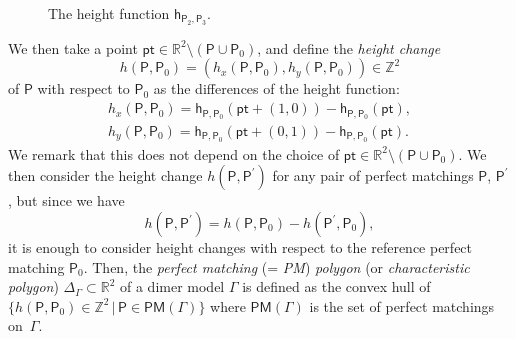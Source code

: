 \documentclass[pdftex]{sigma}%
\numberwithin{equation}{section}
\numberwithin{figure}{section}
\numberwithin{table}{section}
\newcommand{\ZZ}{\mathbb{Z}}
\newcommand{\RR}{\mathbb{R}}
\newcommand{\pt}{\mathsf{pt}}
\newcommand{\sfh}{\mathsf{h}}
\newcommand{\sfP}{\mathsf{P}}
\newcommand{\PM}{\mathsf{PM}}
\begin{document}
\begin{figure}[h!]
{
}
\caption{The height function $\sfh_{\sfP_2,\sfP_3}$.}\label{fig_heightchnge}
\end{figure}

We then take a point $\pt\in\RR^2{\setminus}(\sfP\cup\sfP_0)$, and define the \emph{height change}
\begin{displaymath}
h(\sfP,\sfP_0)=(h_x(\sfP,\sfP_0),h_y(\sfP,\sfP_0))\in\ZZ^2
\end{displaymath}
of $\sfP$ with respect to $\sfP_0$ as the differences of the height function:
\begin{gather*}
h_x(\sfP,\sfP_0)=\sfh_{\sfP,\sfP_0}(\pt+(1,0))-\sfh_{\sfP,\sfP_0}(\pt),
\\
h_y(\sfP,\sfP_0)=\sfh_{\sfP,\sfP_0}(\pt+(0,1))-\sfh_{\sfP,\sfP_0}(\pt).
\end{gather*}
We remark that this does not depend on the choice of $\pt\in\RR^2{\setminus}(\sfP\cup\sfP_0)$.
We then consider the height change $h(\sfP,\sfP^\prime)$ for any pair of perfect matchings $\sfP$, $\sfP^\prime$,
but since we have
\begin{equation*}%
h(\sfP,\sfP^\prime)=h(\sfP,\sfP_0)-h(\sfP^\prime,\sfP_0),
\end{equation*}
it is enough to consider height changes with respect to the reference perfect matching $\sfP_0$.
Then, the \emph{perfect matching} (= \emph{PM}) \emph{polygon} (or \emph{characteristic polygon}) $\Delta_\Gamma\subset\RR^2$ of a dimer model $\Gamma$ is defined
as the convex hull of $\big\{h(\sfP,\sfP_0)\in\ZZ^2\,|\, \sfP\in\PM(\Gamma)\big\}$ where $\PM(\Gamma)$ is the set of perfect matchings on~$\Gamma$.
\end{document}
